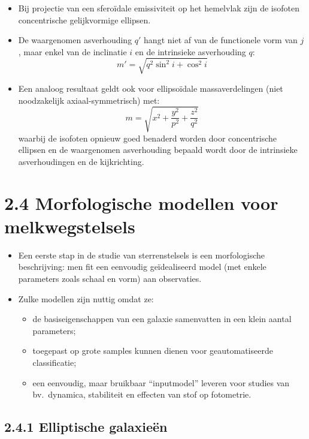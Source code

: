 \documentclass[10pt,a4paper]{article}
\renewenvironment{equation}{\begin{equation*}}{\end{equation*}}
\begin{document}
\begin{itemize}
  \item Bij projectie van een sfero\"idale emissiviteit op het hemelvlak zijn de isofoten concentrische gelijkvormige ellipsen.
  \item De waargenomen asverhouding $q'$ hangt niet af van de functionele vorm van $j$, maar enkel van de inclinatie $i$ en de intrinsieke asverhouding $q$:
  \begin{equation}
    m'=\sqrt{q^2\sin^2 i+\cos^2 i}
    \tag{2.28}
  \end{equation}
  \item Een analoog resultaat geldt ook voor ellipso\"idale massaverdelingen (niet noodzakelijk axiaal-symmetrisch) met:
  \begin{equation}
    m=\sqrt{x^2+\frac{y^2}{p^2}+\frac{z^2}{q^2}}
    \tag{2.29}
  \end{equation}
  waarbij de isofoten opnieuw goed benaderd worden door concentrische ellipsen en de waargenomen asverhouding bepaald wordt door de intrinsieke asverhoudingen en de kijkrichting.
\end{itemize}

\section*{2.4 Morfologische modellen voor melkwegstelsels}
\begin{itemize}
  \item Een eerste stap in de studie van sterrenstelsels is een morfologische beschrijving: men fit een eenvoudig geïdealiseerd model (met enkele parameters zoals schaal en vorm) aan observaties.
  \item Zulke modellen zijn nuttig omdat ze:
  \begin{itemize}
    \item de basiseigenschappen van een galaxie samenvatten in een klein aantal parameters;
    \item toegepast op grote samples kunnen dienen voor geautomatiseerde classificatie;
    \item een eenvoudig, maar bruikbaar ``inputmodel'' leveren voor studies van bv.\ dynamica, stabiliteit en effecten van stof op fotometrie.
  \end{itemize}
\end{itemize}
\subsection*{2.4.1 Elliptische galaxieën}
\end{document}
